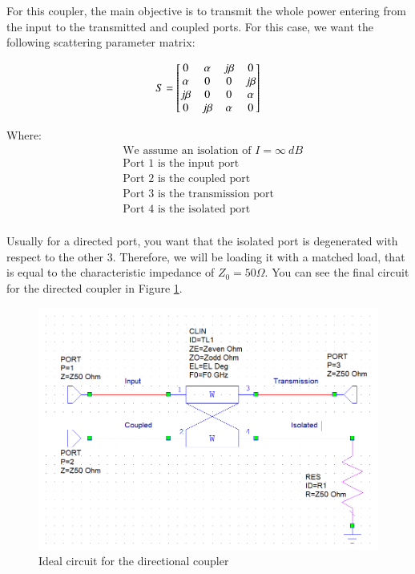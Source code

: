 \documentclass[12pt]{report} %
\begin{document}
For this coupler, the main objective is to transmit the whole power entering from the input to the transmitted and coupled ports. For this case, we want the following scattering parameter matrix:

\[
S = \begin{bmatrix}
0 & \alpha & j \* \beta & 0 \\
\alpha & 0 & 0 & j \* \beta \\
j \* \beta & 0 & 0 & \alpha \\
0 & j \* \beta & \alpha & 0 \\
\end{bmatrix}
\]

Where:
\begin{align*}
& \text{We assume an isolation of $I = \infty \ dB$}  \\
& \text{Port 1 is the input port} \\
& \text{Port 2 is the coupled port} \\
& \text{Port 3 is the transmission port} \\
& \text{Port 4 is the isolated port} \\
\end{align*}

Usually for a directed port, you want that the isolated port is degenerated with respect to the other 3. Therefore, we will be loading it with a matched load, that is equal to the characteristic impedance of $Z_0 = 50 \Omega$. You can see the final circuit for the directed coupler in Figure \ref{fig:design_circuit_elements:directional_coupler_ideal_circuit}.

\begin{figure}[htbp]
    \centering
    \includegraphics[width=\textwidth]{images/design_circuit_elements/directional_coupler_ideal_circuit.png}
    \caption{Ideal circuit for the directional coupler}
    \label{fig:design_circuit_elements:directional_coupler_ideal_circuit}
\end{figure}
\end{document}

